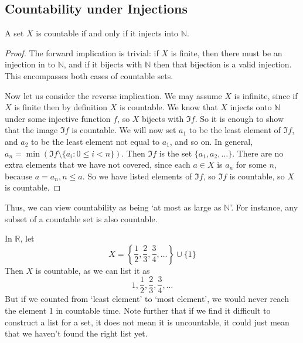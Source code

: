 \subsection{Countability under Injections}
\begin{proposition}
	A set \(X\) is countable if and only if it injects into \(\mathbb N\).
\end{proposition}
\begin{proof}
	The forward implication is trivial: if \(X\) is finite, then there must be an injection in to \(\mathbb N\), and if it bijects with \(\mathbb N\) then that bijection is a valid injection. This encompasses both cases of countable sets.

	Now let us consider the reverse implication. We may assume \(X\) is infinite, since if \(X\) is finite then by definition \(X\) is countable. We know that \(X\) injects onto \(\mathbb N\) under some injective function \(f\), so \(X\) bijects with \(\Im f\). So it is enough to show that the image \(\Im f\) is countable. We will now set \(a_1\) to be the least element of \(\Im f\), and \(a_2\) to be the least element not equal to \(a_1\), and so on. In general, \(a_n = \min (\Im f \setminus \{ a_i : 0 \leq i < n \})\). Then \(\Im f\) is the set \(\{ a_1, a_2, \dots \}\). There are no extra elements that we have not covered, since each \(a \in X\) is \(a_n\) for some \(n\), because \(a=a_n, n \leq a\). So we have listed elements of \(\Im f\), so \(\Im f\) is countable, so \(X\) is countable.
\end{proof}
Thus, we can view countability as being `at most as large as \(\mathbb N\)'. For instance, any subset of a countable set is also countable.

\begin{remark}
	In \(\mathbb R\), let
	\[ X = \left\{ \frac{1}{2}, \frac{2}{3}, \frac{3}{4}, \dots \right\} \cup \{ 1 \} \]
	Then \(X\) is countable, as we can list it as
	\[ 1, \frac{1}{2}, \frac{2}{3}, \frac{3}{4}, \dots \]
	But if we counted from `least element' to `most element', we would never reach the element 1 in countable time. Note further that if we find it difficult to construct a list for a set, it does not mean it is uncountable, it could just mean that we haven't found the right list yet.
\end{remark}
